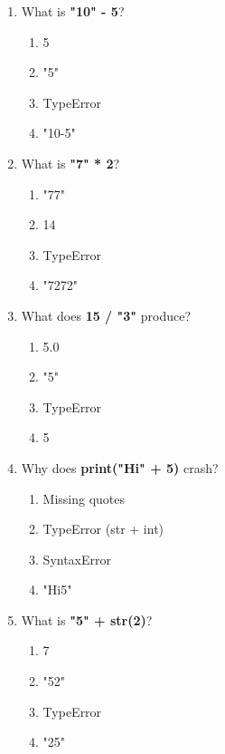 \documentclass{article}
\begin{document}
\begin{multicols*}{4}
\begin{enumerate}
        \item What is \textbf{"10" - 5}?
        \begin{enumerate}[label=(\Alph*)]
            \item 5
            \item "5"
            \item TypeError
            \item "10-5"
        \end{enumerate}

        \item What is \textbf{"7" * 2}?
        \begin{enumerate}[label=(\Alph*)]
            \item "77"
            \item 14
            \item TypeError
            \item "7272"
        \end{enumerate}

        \item What does \textbf{15 / "3"} produce?
        \begin{enumerate}[label=(\Alph*)]
            \item 5.0
            \item "5"
            \item TypeError
            \item 5
        \end{enumerate}

        \item Why does \textbf{print("Hi" + 5)} crash?
        \begin{enumerate}[label=(\Alph*)]
            \item Missing quotes
            \item TypeError (str + int)
            \item SyntaxError
            \item "Hi5"
        \end{enumerate}


        \item What is \textbf{"5" + str(2)}?
        \begin{enumerate}[label=(\Alph*)]
            \item 7
            \item "52"
            \item TypeError
            \item "25"
        \end{enumerate}


\end{enumerate}
\end{multicols*}
\end{document}
